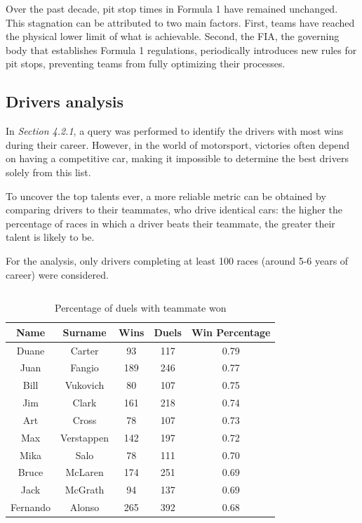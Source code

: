 \documentclass{Configuration_Files/PoliMi3i_thesis}
\begin{document}
Over the past decade, pit stop times in Formula 1 have remained unchanged. This stagnation can be attributed to two main factors. First, teams have reached the physical lower limit of what is achievable. Second, the FIA, the governing body that establishes Formula 1 regulations, periodically introduces new rules for pit stops, preventing teams from fully optimizing their processes.


\subsection{Drivers analysis}
In \textit{Section 4.2.1}, a query was performed to identify the drivers with most wins during their career. However, in the world of motorsport, victories often depend on having a competitive car, making it impossible to determine the best drivers solely from this list.

To uncover the top talents ever, a more reliable metric can be obtained by comparing drivers to their teammates, who drive identical cars: the higher the percentage of races in which a driver beats their teammate, the greater their talent is likely to be.

For the analysis, only drivers completing at least 100 races (around 5-6 years of career) were considered.

\vspace{0.5cm}
\inputminted[frame=single,framesep=10pt,breaklines]{python}{formula1/queries/query7.py}

\vspace{0.5cm}
\begin{table}[!h]
    \centering
    \begin{tabular}{|c|c|c|c|c|}
        \hline
        \textbf{Name} & \textbf{Surname} & \textbf{Wins} & \textbf{Duels} & \textbf{Win Percentage} \\
        \hline
        Duane & Carter & 93 & 117 & 0.79 \\
        Juan & Fangio & 189 & 246 & 0.77 \\
        Bill & Vukovich & 80 & 107 & 0.75 \\
        Jim & Clark & 161 & 218 & 0.74 \\
        Art & Cross & 78 & 107 & 0.73 \\
        Max & Verstappen & 142 & 197 & 0.72 \\
        Mika & Salo & 78 & 111 & 0.70 \\
        Bruce & McLaren & 174 & 251 & 0.69 \\
        Jack & McGrath & 94 & 137 & 0.69 \\
        Fernando & Alonso & 265 & 392 & 0.68 \\
        \hline
    \end{tabular}
    \caption{Percentage of duels with teammate won}
\end{table}
\end{document}
